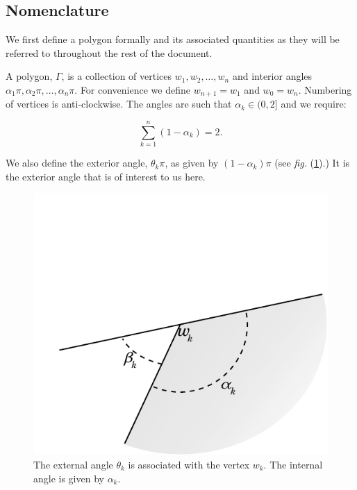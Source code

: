 \documentclass[a4paper,10pt]{amsart}
\newcommand{\fig}[1]{\emph{fig.} (\ref{#1})}
\begin{document}
\subsection{Nomenclature}

We first define a polygon formally and its associated quantities as they will be referred to throughout the rest of the document.

A polygon, $\Gamma$, is a collection of vertices $w_1, w_2,\dots,w_n$ and interior angles $\alpha_1\pi, \alpha_2\pi, \dots, \alpha_n\pi$. For convenience we define $w_{n+1} = w_1$ and $w_0=w_n$. Numbering of vertices is anti-clockwise. The angles are such that $\alpha_k \in (0,2]$ and we require:

\begin{equation}
\sum_{k=1}^n (1-\alpha_k) = 2.
\end{equation}

We also define the exterior angle, $\theta_k\pi$, as given by $(1-\alpha_k)\pi$ (see \fig{anglediagram}.) It is the exterior angle that is of interest to us here.

\begin{figure} [bp]
\centering
\includegraphics[scale=0.6]{figs/anglediagram.pdf}
\caption{The external angle $\theta_k$ is associated with the vertex $w_k$. The internal angle is given by $\alpha_k$.}
\label{anglediagram}
\end{figure}
\end{document}
